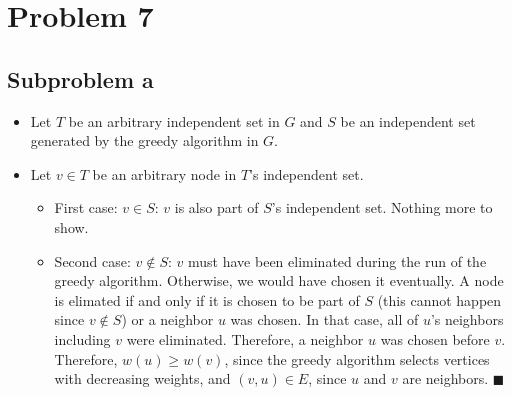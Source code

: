 \documentclass[12pt]{article}
\begin{document}
\section*{Problem 7}
\subsection*{Subproblem a}
\begin{itemize}
	\item Let $T$ be an arbitrary independent set in $G$ and $S$ be an independent set generated by the greedy algorithm in $G$.
	\item Let $v \in T$ be an arbitrary node in $T$'s independent set.
	\begin{itemize}
		\item First case: $v \in S$: $v$ is also part of $S$'s independent set. Nothing more to show.
		\item Second case: $v \not \in S$: $v$ must have been eliminated during the run of the greedy algorithm. Otherwise, we would have chosen it eventually. A node is elimated if and only if it is chosen to be part of $S$ (this cannot happen since $v \not \in S$) or a neighbor $u$ was chosen. In that case, all of $u$'s neighbors including $v$ were eliminated. Therefore, a neighbor $u$ was chosen before $v$. Therefore, $w(u) \geq w(v)$, since the greedy algorithm selects vertices with decreasing weights, and $(v,u) \in E$, since $u$ and $v$ are neighbors. \hfill $\blacksquare$
	\end{itemize}
\end{itemize}
\end{document}
